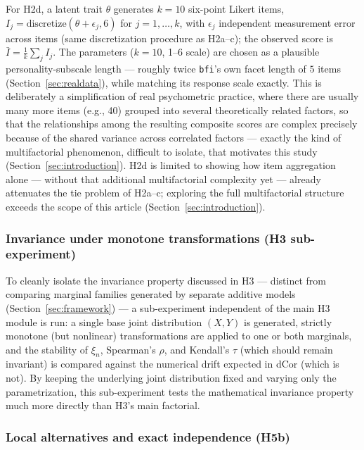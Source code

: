 \documentclass[article]{ajs}
\begin{document}
For H2d, a latent trait $\theta$ generates $k=10$ six-point Likert
items, $I_j = \mathrm{discretize}(\theta + \epsilon_j, 6)$ for
$j=1,\dots,k$, with $\epsilon_j$ independent measurement error across
items (same discretization procedure as H2a--c); the observed score is
$\bar{I} = \frac{1}{k}\sum_j I_j$. The parameters ($k=10$, 1--6 scale)
are chosen as a plausible personality-subscale length --- roughly
twice \texttt{bfi}'s own facet length of $5$ items (Section~\ref{sec:realdata}),
while matching its response scale exactly. This is deliberately a simplification of
real psychometric practice, where there are usually many more items
(e.g., 40) grouped into several theoretically related factors, so that
the relationships among the resulting composite scores are complex
precisely because of the shared variance across correlated factors ---
exactly the kind of multifactorial phenomenon, difficult to isolate,
that motivates this study (Section~\ref{sec:introduction}). H2d is
limited to showing how item aggregation alone --- without that
additional multifactorial complexity yet --- already attenuates the
tie problem of H2a--c; exploring the full multifactorial structure
exceeds the scope of this article (Section~\ref{sec:introduction}).

\subsubsection{Invariance under monotone transformations (H3 sub-experiment)}

To cleanly isolate the invariance property discussed in H3 ---
distinct from comparing marginal families generated by separate
additive models (Section~\ref{sec:framework}) --- a sub-experiment
independent of the main H3 module is run: a single base joint
distribution $(X,Y)$ is generated, strictly monotone (but nonlinear)
transformations are applied to one or both marginals, and the
stability of $\xi_n$, Spearman's $\rho$, and Kendall's $\tau$ (which
should remain invariant) is compared against the numerical drift
expected in dCor (which is not). By keeping the underlying joint
distribution fixed and varying only the parametrization, this
sub-experiment tests the mathematical invariance property much more
directly than H3's main factorial.

\subsubsection{Local alternatives and exact independence (H5b)}
\end{document}
